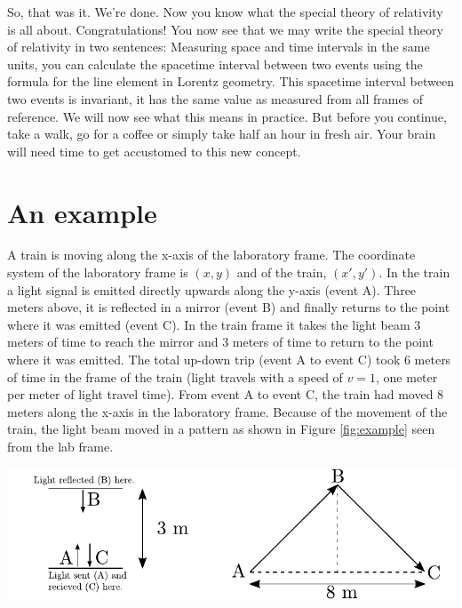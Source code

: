 {\begin{multicols}{2}
So, that was it. We're done. Now you know what the special theory of relativity is all about. Congratulations! You now see that we may write the special theory of relativity in two sentences: Measuring space and time intervals in the same units, you can calculate the spacetime interval between two events using the formula for the line element in Lorentz geometry. This spacetime interval between two events is invariant, it has the same value as measured from all frames of reference. We will now see what this means in practice. But before you continue, take a walk, go for a coffee or simply take half an hour in fresh air. Your brain will need time to get accustomed to this new concept.

\section{An example}
\label{sect:example}

A train is moving along the x-axis of the laboratory frame. The coordinate system of the laboratory frame is $(x,y)$ and of the train, $(x',y')$. In the train a light signal is emitted directly upwards along the y-axis (event A). Three meters above, it is reflected in a mirror (event B) and finally returns to the point where it was emitted (event C). In the train frame it takes the light beam 3 meters of time to reach the mirror and 3 meters of time to return to the point where it was emitted. The total up-down trip (event A to event C) took 6 meters of time in the frame of the train (light travels with a speed of $v=1$, one meter per meter of light travel time). From event A to event C, the train had moved 8 meters along the x-axis in the laboratory frame. Because of the movement of the train, the light beam moved in a pattern as shown in Figure \ref{fig:example} seen from the lab frame. 

\begin{Figure}%
\centering
\includegraphics[width=\textwidth]{fig_7-6.pdf}
\end{Figure}


\end{multicols}}
